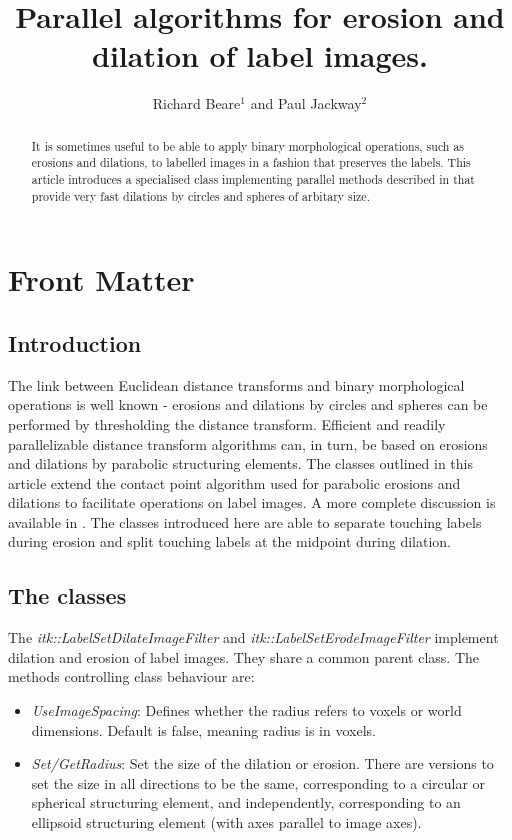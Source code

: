 \documentclass{InsightArticle}
\title{Parallel algorithms for erosion and dilation of label images.}
\author{Richard Beare{$^1$} {\small and} Paul Jackway{$^2$}}
\newcommand{\IJhandlerIDnumber}{999}
\begin{document}
\IJhandlefooter{\IJhandlerIDnumber}

\maketitle

\ifhtml
\chapter*{Front Matter\label{front}}
\fi


\begin{abstract}
\noindent
It is sometimes useful to be able to apply binary morphological
operations, such as erosions and dilations, to labelled images in a
fashion that preserves the labels. This article introduces a
specialised class implementing parallel methods described in
\cite{beare2011parallel} that provide very fast dilations by circles
and spheres of arbitary size.
\end{abstract}
\IJhandlenote{\IJhandlerIDnumber}
\tableofcontents

\section{Introduction}
The link between Euclidean distance transforms and binary
morphological operations is well known - erosions and dilations by
circles and spheres can be performed by thresholding the distance
transform. Efficient and readily parallelizable distance transform
algorithms can, in turn, be based on erosions and dilations by
parabolic structuring elements. The classes outlined in this article
extend the contact point algorithm used for parabolic erosions and
dilations to facilitate operations on label images. A more complete
discussion is available in \cite{beare2011parallel}. The classes
introduced here are able to separate touching labels during erosion
and split touching labels at the midpoint during dilation.

\section{The classes}
The {\em itk::LabelSetDilateImageFilter} and {\em
  itk::LabelSetErodeImageFilter} implement dilation and erosion of
label images. They share a common parent class. The methods controlling class behaviour are:
\begin{itemize}
\item {\em UseImageSpacing}: Defines whether the radius refers to voxels or world dimensions. Default is false, meaning radius is in voxels.
\item {\em Set/GetRadius}: Set the size of the dilation or erosion. There are versions to set the size in all directions to be the same, corresponding to a circular or spherical structuring element, and independently, corresponding to an ellipsoid structuring element (with axes parallel to image axes).
\end{itemize}
\end{document}
